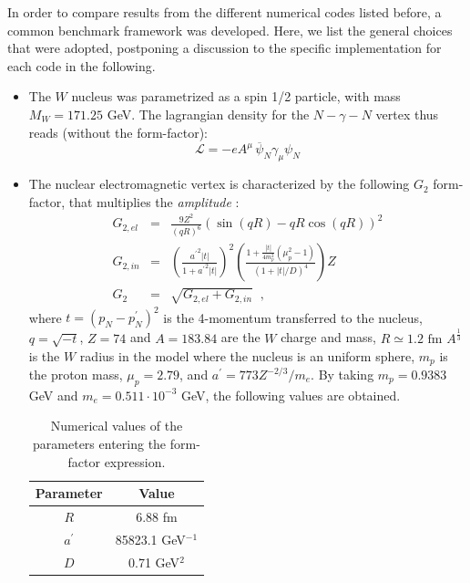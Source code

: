 \documentclass{article}
\begin{document}
In order to compare results from the different numerical codes listed before, a common benchmark framework was developed. Here, we list the general choices that were adopted, postponing a discussion to the specific implementation for each code in the following.
\begin{itemize}
\item The $W$ nucleus was parametrized as a spin 1/2 particle, with mass $M_W=171.25$ GeV. The lagrangian density for the $N-\gamma-N$ vertex thus reads (without the form-factor):
\begin{equation}
\mathcal{L}=-eA^\mu\,\overline{\psi}_N\gamma_\mu{\psi_N}
\end{equation}
\item The nuclear electromagnetic vertex is characterized by the following $G_2$ form-factor, that multiplies the \textit{amplitude} \cite{Bjorken:2009mm}: 
\begin{eqnarray}
G_{2,el}&=&\frac{9Z^2}{(qR)^6}(\sin(qR)-qR\cos(qR))^2\nonumber \\
G_{2,in}&=& \left( \frac{{a^\prime}^2|t|}{1+{a^\prime}^2|t|}\right)^2 \left( \frac{1+\frac{|t|}{4m_p^2}(\mu^2_p-1)}{(1+|t|/D)^4} \right) Z\nonumber \\
G_2 &=& \sqrt{G_{2,el}+G_{2,in}} \; \; ,
\end{eqnarray}
where $t=(p_N - p_N^\prime)^2$ is the 4-momentum transferred to the nucleus, $q=\sqrt{-t}$, $Z=74$ and $A=183.84$ are the $W$ charge and mass, $R\simeq 1.2 \mbox{ fm }A^\frac{1}{3}$ is the $W$ radius in the model where the nucleus is an uniform sphere, $m_p$ is the proton mass, $\mu_p=2.79$, and $a^\prime=773 Z^{-2/3}/m_e$. By taking $m_p=0.9383$ GeV and $m_e=0.511\cdot 10^{-3}$ GeV, the following values are obtained. %
\begin{table}[H]
\centering
\begin{tabular}{|c|c|}
\hline
\textbf{Parameter}&\textbf{Value}\\
\hline
$R$ & 6.88 fm \\
\hline
$a^\prime$ & 85823.1 GeV$^{-1}$ \\
\hline
$D$ & 0.71 GeV$^2$ \\
\hline
\end{tabular}
\caption{Numerical values of the parameters entering the form-factor expression.}
\end{table}


\end{itemize}
\end{document}
